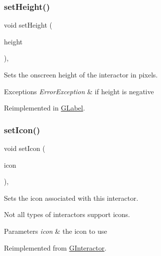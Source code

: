\subsubsection{\texorpdfstring{set\+Height()}{setHeight()}}
{\footnotesize\ttfamily void set\+Height (\begin{DoxyParamCaption}\item[{double}]{height }\end{DoxyParamCaption})\hspace{0.3cm}{\ttfamily [virtual]}, {\ttfamily [inherited]}}



Sets the onscreen height of the interactor in pixels. 


\begin{DoxyExceptions}{Exceptions}
{\em Error\+Exception} & if height is negative \\
\hline
\end{DoxyExceptions}


Reimplemented in \mbox{\hyperlink{classsgl_1_1GLabel_a5eead864d1249c4406f32f9944ed1503}{G\+Label}}.

\mbox{\label{classsgl_1_1GButton_acca97b6c6330abded1c80521c9aca3a6}} 
\subsubsection{\texorpdfstring{set\+Icon()}{setIcon()}\hspace{0.1cm}{\footnotesize\ttfamily [1/3]}}
{\footnotesize\ttfamily void set\+Icon (\begin{DoxyParamCaption}\item[{const Q\+Icon \&}]{icon }\end{DoxyParamCaption})\hspace{0.3cm}{\ttfamily [override]}, {\ttfamily [virtual]}}



Sets the icon associated with this interactor. 

Not all types of interactors support icons. 
\begin{DoxyParams}{Parameters}
{\em icon} & the icon to use \\
\hline
\end{DoxyParams}


Reimplemented from \mbox{\hyperlink{classsgl_1_1GInteractor_a542abfcd7261751352af129c7215ecda}{G\+Interactor}}.

